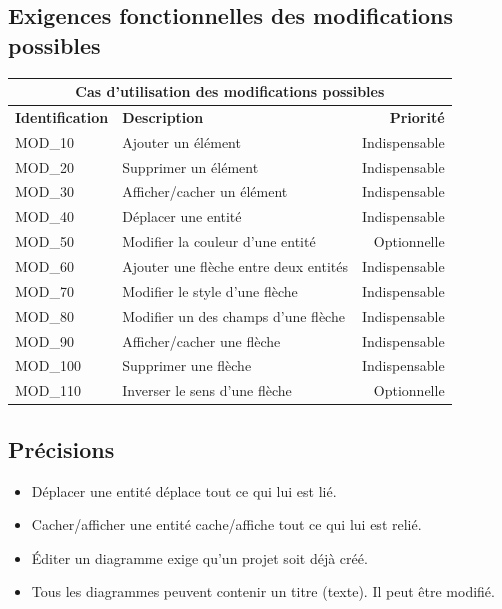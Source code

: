 \documentclass[hidelinks, 10pt,a4paper]{article}
\begin{document}
\subsection{Exigences fonctionnelles des modifications possibles}
\begin{center}
    \begin{tabular}{|l|p{8cm}|r|}
        \hline\multicolumn{3}{|c|}{Cas d’utilisation des modifications possibles} \\\hline
        {\textbf{Identification}} & {\textbf{Description}} & {\textbf{Priorité}} \\\hline
        {MOD\_10} & {Ajouter un élément} & {Indispensable} \\\hline
        {MOD\_20} & {Supprimer un élément} & {Indispensable} \\\hline
        {MOD\_30} & {Afficher/cacher un élément} & {Indispensable} \\\hline
        {MOD\_40} & {Déplacer une entité} & {Indispensable} \\\hline
        {MOD\_50} & {Modifier la couleur d’une entité} & {Optionnelle} \\\hline
        {MOD\_60} & {Ajouter une flèche entre deux entités} & {Indispensable} \\\hline
        {MOD\_70} & {Modifier le style d’une flèche} & {Indispensable} \\\hline
        {MOD\_80} & {Modifier un des champs d’une flèche} & {Indispensable} \\\hline
        {MOD\_90} & {Afficher/cacher une flèche} & {Indispensable} \\\hline
        {MOD\_100} & {Supprimer une flèche} & {Indispensable} \\\hline
        {MOD\_110} & {Inverser le sens d’une flèche} & {Optionnelle} \\\hline
    \end{tabular}
\end{center}

\subsection{Précisions}
\begin{itemize}
 \item Déplacer une entité déplace tout ce qui lui est lié.
 \item Cacher/afficher une entité cache/affiche tout ce qui lui est relié.
 \item Éditer un diagramme exige qu’un projet soit déjà créé.
 \item Tous les diagrammes peuvent contenir un titre (texte). Il peut être modifié.
\end{itemize}
\end{document}

